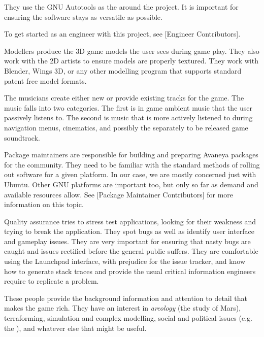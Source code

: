 They use the GNU Autotools as the  around the project. It is important for ensuring the software stays as versatile as possible. 

To get started as an engineer with this project, see [Engineer Contributors].


Modellers produce the 3D game models the user sees during game play. They also work with the 2D artists to ensure models are properly textured. They work with Blender, Wings 3D, or any other modelling program that supports standard patent free model formats.


The musicians create either new or provide existing tracks for the game. The music falls into two categories. The first is in game ambient music that the user passively listens to. The second is music that is more actively listened to during navigation menus, cinematics, and possibly the separately to be released game soundtrack.


Package maintainers are responsible for building and preparing Avaneya packages for the community. They need to be familiar with the standard methods of rolling out software for a given platform. In our case, we are mostly concerned just with Ubuntu. Other GNU platforms are important too, but only so far as demand and available resources allow. See [Package Maintainer Contributors] for more information on this topic.


Quality assurance tries to stress test applications, looking for their weakness and trying to break the application. They spot bugs as well as identify user interface and gameplay issues. They are very important for ensuring that nasty bugs are caught and issues rectified before the general public suffers. They are comfortable using the Launchpad interface, with prejudice for the issue tracker, and know how to generate stack traces and provide the usual critical information engineers require to replicate a problem.


These people provide the background information and attention to detail that makes the game rich. They have an interest in {\it areology} (the study of Mars), terraforming, simulation and complex modelling, social and political issues (e.g. the ), and whatever else that might be useful.

